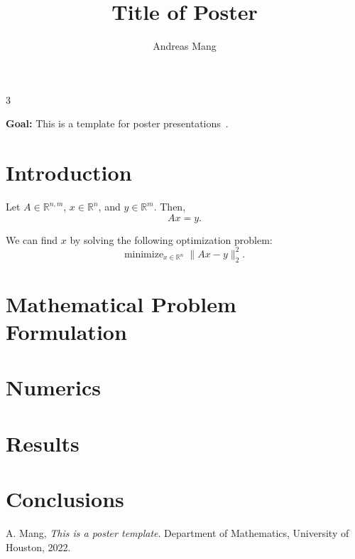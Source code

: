 \documentclass[plainsections,30pt]{sciposter}
\author{Andreas Mang}
\institute{Department of Mathematics, University of Houston, Houston, TX, USA}
\title{Title of Poster}
\def\numcols{3}
\begin{document}


\begin{multicols}{\numcols}

\begin{sectionbox}{}
\textbf{Goal:} This is a template for poster presentations~\cite{Mang:2022a}.
\end{sectionbox}


\section*{Introduction}

Let $A \in \mathbb{R}^{n,m}$, $x \in \mathbb{R}^n$, and $y \in \mathbb{R}^m$. Then,
\[
A x = y.
\]

We can find $x$ by solving the following optimization problem:
\[
\text{minimize}_{x\in\mathbb{R}^n} \; \|Ax-y\|_2^2.
\]

\section*{Mathematical Problem Formulation}


\section*{Numerics}


\section*{Results}


\section*{Conclusions}


\begin{footnotesize}
\begin{thebibliography}{9}
 A. Mang, {\em This is a poster template}. Department of Mathematics, University of Houston, 2022.
\end{thebibliography}
\end{footnotesize}

\end{multicols}
\end{document}
